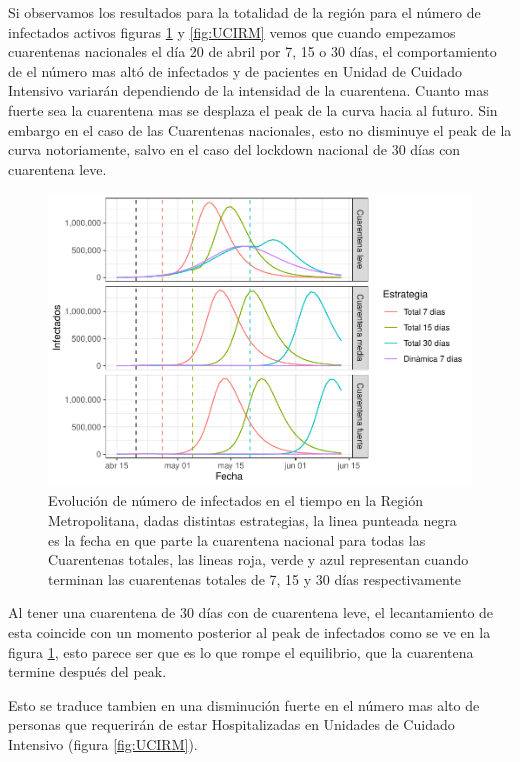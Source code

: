 \documentclass[]{article}
\begin{document}
Si observamos los resultados para la totalidad de la región para el número de infectados activos figuras \ref{fig:InfectadosRM} y \ref{fig:UCIRM} vemos que cuando empezamos cuarentenas nacionales el día 20 de abril por 7, 15 o 30 días, el comportamiento de el número mas altó de infectados y de pacientes en Unidad de Cuidado Intensivo variarán dependiendo de la intensidad de la cuarentena. Cuanto mas fuerte sea la cuarentena mas se desplaza el peak de la curva hacia al futuro. Sin embargo en el caso de las Cuarentenas nacionales, esto no disminuye el peak de la curva notoriamente, salvo en el caso del lockdown nacional de 30 días con cuarentena leve.

\begin{figure}
\centering
\includegraphics{Informe_Mesa_2020_04_16_files/figure-latex/InfectadosRM-1.pdf}
\caption{\label{fig:InfectadosRM}Evolución de número de infectados en el tiempo en la Región Metropolitana, dadas distintas estrategias, la linea punteada negra es la fecha en que parte la cuarentena nacional para todas las Cuarentenas totales, las lineas roja, verde y azul representan cuando terminan las cuarentenas totales de 7, 15 y 30 días respectivamente}
\end{figure}

Al tener una cuarentena de 30 días con de cuarentena leve, el lecantamiento de esta coincide con un momento posterior al peak de infectados como se ve en la figura \ref{fig:InfectadosRM}, esto parece ser que es lo que rompe el equilibrio, que la cuarentena termine después del peak.

Esto se traduce tambien en una disminución fuerte en el número mas alto de personas que requerirán de estar Hospitalizadas en Unidades de Cuidado Intensivo (figura \ref{fig:UCIRM}).
\end{document}
